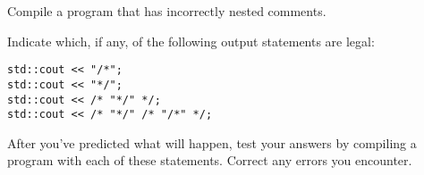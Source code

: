 %
%
\begin{question}
Compile a program that has incorrectly nested comments.
\end{question}

\begin{question}
Indicate which, if any, of the following output statements are
legal:
\begin{verbatim}
std::cout << "/*";
std::cout << "*/";
std::cout << /* "*/" */;
std::cout << /* "*/" /* "/*" */;
\end{verbatim}
After you’ve predicted what will happen, test your answers by compiling a
program with each of these statements. Correct any errors you encounter.
\end{question}
